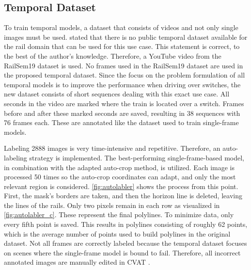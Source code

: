 \subsection{Temporal Dataset}
\label{sec:tempDataset}

To train temporal models, a dataset that consists of videos and not only single images must be used.
\cite{tepNet2024} stated that there is no public temporal dataset available for the rail domain that can be used for this use case.
This statement is correct, to the best of the author's knowledge.
Therefore, a YouTube video \cite{temporalDataset_youtube_video} from the RailSem19 dataset is used.
No frames used in the RailSem19 dataset are used in the proposed temporal dataset.
Since the focus on the problem formulation of all temporal models is to improve the performance when driving over switches, the new dataset consists of short sequences dealing with this exact use case.
All seconds in the video \cite{temporalDataset_youtube_video} are marked where the train is located over a switch.
Frames before and after these marked seconds are saved, resulting in 38 sequences with 76 frames each. These are annotated like the dataset used to train single-frame models.

Labeling 2888 images is very time-intensive and repetitive.
Therefore, an auto-labeling strategy is implemented.
The best-performing single-frame-based model, in combination with the adapted auto-crop method, is utilized.
Each image is processed 50 times so the auto-crop coordinates can adapt, and only the most relevant region is considered.
\autoref{fig:autolabler} shows the process from this point.
First, the mask's borders are taken, and then the horizon line is deleted, leaving the lines of the rails.
Only two pixels remain in each row as visualized in \autoref{fig:autolabler_c}.
These represent the final polylines. To minimize data, only every fifth point is saved.
This results in polylines consisting of roughly 62 points, which is the average number of points used to build polylines in the original dataset.
Not all frames are correctly labeled because the temporal dataset focuses on scenes where the single-frame model is bound to fail.
Therefore, all incorrect annotated images are manually edited in CVAT \cite{cvat}.

